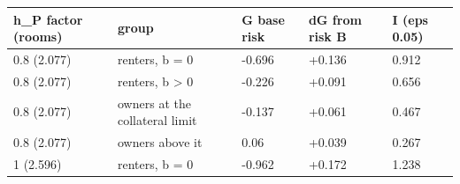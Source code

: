 \begingroup\small
\setlength{\tabcolsep}{3pt}
\renewcommand{\arraystretch}{1.04}
\begin{tabularx}{\linewidth}{XXXXX}
\toprule
h\_P factor (rooms) & group & G base risk & dG from risk B & I (eps 0.05) \\
\midrule
0.8 (2.077) & renters, b = 0 & -0.696 & +0.136 & 0.912 \\
0.8 (2.077) & renters, b \textgreater{} 0 & -0.226 & +0.091 & 0.656 \\
0.8 (2.077) & owners at the collateral limit & -0.137 & +0.061 & 0.467 \\
0.8 (2.077) & owners above it & 0.06 & +0.039 & 0.267 \\
1 (2.596) & renters, b = 0 & -0.962 & +0.172 & 1.238 \\
\bottomrule
\end{tabularx}
\endgroup
